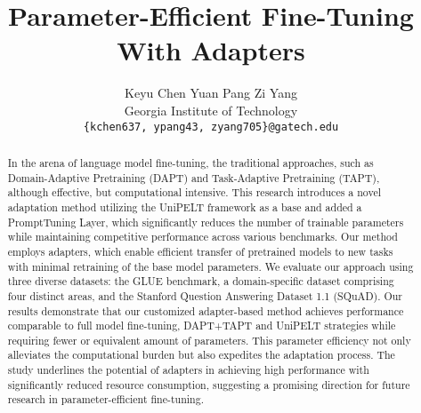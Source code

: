 \documentclass[10pt,twocolumn,letterpaper]{article}
\begin{document}
\title{Parameter-Efficient Fine-Tuning With Adapters}

\author{Keyu Chen
\qquad Yuan Pang
\qquad Zi Yang\\
Georgia Institute of Technology\\
{\tt\small \{kchen637, ypang43, zyang705\}@gatech.edu}}


\maketitle

\begin{abstract}
In the arena of language model fine-tuning, the traditional approaches, such as Domain-Adaptive Pretraining (DAPT) and Task-Adaptive Pretraining (TAPT), although effective, but computational intensive. This research introduces a novel adaptation method utilizing the UniPELT framework as a base and added a PromptTuning Layer, which significantly reduces the number of trainable parameters while maintaining competitive performance across various benchmarks. Our method employs adapters, which enable efficient transfer of pretrained models to new tasks with minimal retraining of the base model parameters. We evaluate our approach using three diverse datasets: the GLUE benchmark, a domain-specific dataset comprising four distinct areas, and the Stanford Question Answering Dataset 1.1 (SQuAD). Our results demonstrate that our customized adapter-based method achieves performance comparable to full model fine-tuning, DAPT+TAPT and UniPELT strategies while requiring fewer or equivalent amount of parameters. This parameter efficiency not only alleviates the computational burden but also expedites the adaptation process. The study underlines the potential of adapters in achieving high performance with significantly reduced resource consumption, suggesting a promising direction for future research in parameter-efficient fine-tuning.
\end{abstract}
\end{document}
